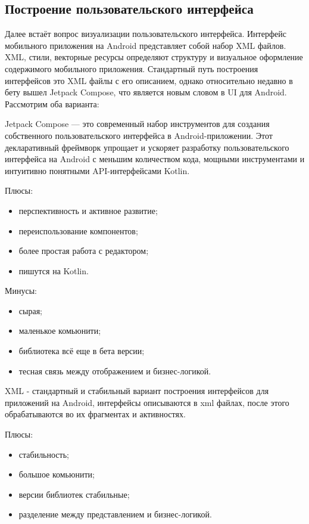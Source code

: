 \subsection{Построение пользовательского интерфейса}
Далее встаёт вопрос визуализации пользовательского интерфейса. Интерфейс мобильного приложения на Android представляет собой набор XML файлов. 
XML, стили, векторные ресурсы определяют структуру и визуальное оформление содержимого мобильного приложения. Стандартный путь построения интерфейсов это XML файлы с его описанием, однако относительно недавно в бету вышел Jetpack Compose, что является новым словом в UI для Android. Рассмотрим оба варианта:

Jetpack Compose — это современный набор инструментов для создания собственного пользовательского интерфейса в Android-приложении. Этот декларативный фреймворк упрощает и ускоряет разработку пользовательского интерфейса на Android с меньшим количеством кода, мощными инструментами и интуитивно понятными API-интерфейсами Kotlin\cite{web13}.
 
Плюсы:
\begin{itemize}
 \item перспективность и активное развитие;
 \item переиспользование компонентов;
 \item более простая работа с редактором;
 \item пишутся на Kotlin.
\end{itemize}

Минусы:
\begin{itemize}
 \item сырая;
 \item маленькое комьюнити;
 \item библиотека всё еще в бета версии;
 \item тесная связь между отображением и бизнес-логикой.
\end{itemize}

XML - стандартный и стабильный вариант построения интерфейсов для приложений на Android, интерфейсы описываются в xml файлах, после этого обрабатываются во их фрагментах и активностях.

Плюсы:
\begin{itemize}
 \item стабильность;
 \item большое комьюнити;
 \item версии библиотек стабильные;
 \item разделение между представлением и бизнес-логикой.
\end{itemize}

